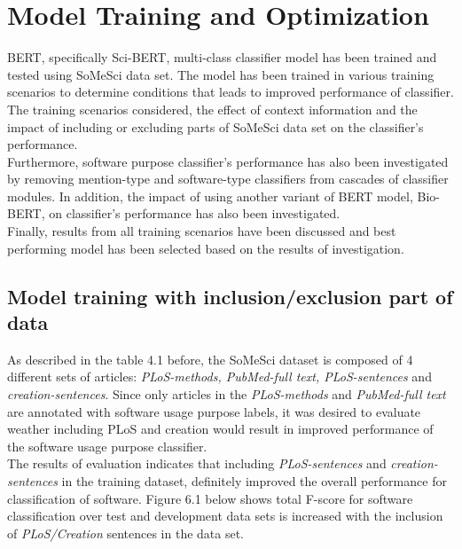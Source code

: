 \chapter{Model Training and Optimization}
\label{ch:chapter06}
 
%
%

\ac{BERT}, specifically \ac{Sci-BERT}, multi-class classifier model has been trained and tested using \ac{SoMeSci} data set. The model has been trained in various training scenarios to determine conditions that leads to improved performance of classifier. The training scenarios considered, the effect of context information  and the impact of including or excluding parts of \ac{SoMeSci} data set on the classifier’s performance.\\
 
Furthermore, software purpose classifier’s performance has also been investigated by removing mention-type and software-type classifiers from cascades of classifier modules.  In addition, the impact of using another variant of BERT model, \ac{Bio-BERT}, on classifier’s performance  has also been investigated. \\

Finally, results from all training scenarios have been discussed and best performing model has been selected based on the results of investigation.

\section{Model training with inclusion/exclusion part of data}
\label{sec:chapter06:exclusion}

As described in the table 4.1 before, the \ac{SoMeSci} dataset is composed of 4 different sets of articles: \emph{PLoS-methods, PubMed-full text,  PLoS-sentences} and \emph{creation-sentences}. Since only articles in the  \emph{PLoS-methods} and \emph{PubMed-full text} are annotated with software usage purpose labels, it was desired to evaluate weather including PLoS and creation would result in improved performance of the software usage purpose classifier.  \\

The results of evaluation indicates that including \emph{ PLoS-sentences} and \emph{creation-sentences} in the training dataset, definitely improved the overall performance for classification of software. Figure 6.1 below shows total F-score for software classification over test and development data sets is increased with the inclusion of \emph{PLoS/Creation} sentences in the data set. \\

